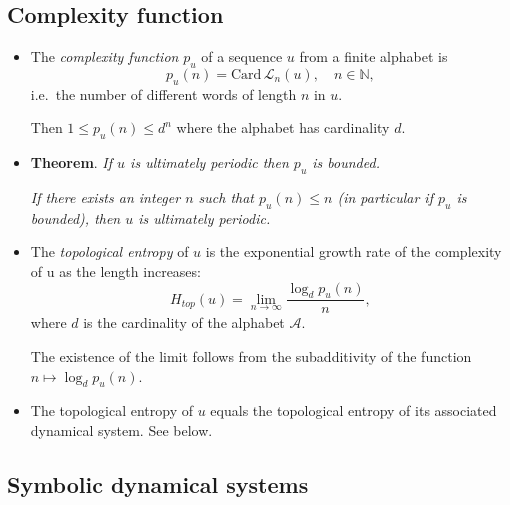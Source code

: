 \documentclass[a4paper,11pt]{amsart}
\begin{document}
\subsection{Complexity function}\mbox{}

\begin{itemize}
\item 
The \emph{complexity function} $p_u$ of  a sequence $u$ from a finite alphabet  is  
\[
 p_u (n) =  \text{Card}\, \mathcal{L}_n (u), \quad n \in \mathbb{N},
 \] 
i.e.\  the number of different words of length $n$ in $u$. 

Then  $1\leq p_u(n) \leq d^n$ where the alphabet has  cardinality $d$.

\item \textbf{Theorem}.  \emph{If $u$ is   ultimately periodic  then $p_u$ 
is  bounded.}

\emph{If there exists an integer $n$ such that $p_u(n) \leq n $ (in particular if $p_u$  is  bounded), then  
$u$ is  ultimately periodic.}

\item The \emph{topological entropy} of $u$ is  the exponential growth rate of the complexity of u as the length increases:
\[ 
H_{top} (u) = \lim_{n\to \infty} \frac{\log_d p_u(n)}{n},
\]
where $d$ is the cardinality of the alphabet $\mathcal{A}$.  

The existence of the limit
follows from the subadditivity of the function $ n\mapsto     \log_d p_u (n) $.    

\item The topological entropy of $u$ equals  the topological entropy of its associated dynamical system.  See below.      

\end{itemize}


\subsection{Symbolic dynamical systems}\mbox{}
\end{document}
